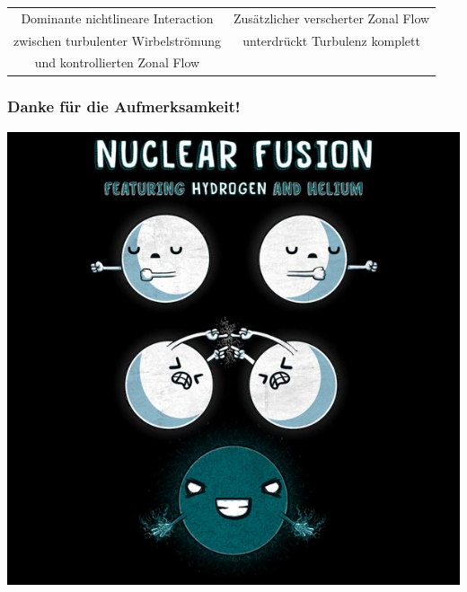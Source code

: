 \documentclass[compress,aspectratio=169]{beamer}
\begin{document}
\begin{frame}
\begin{tabular}{c c}
			Dominante nichtlineare Interaction  & Zusätzlicher verscherter Zonal Flow \\
			zwischen turbulenter Wirbelströmung & unterdrückt Turbulenz komplett \\
			und kontrollierten Zonal Flow & \\
		\end{tabular}
	\end{frame}


	\begin{frame}
		\frametitle{Danke für die Aufmerksamkeit!}
		\includegraphics[scale = 0.35]{Presentation/Fusion_Meme.jpeg} \\
	\end{frame}
\end{document}
